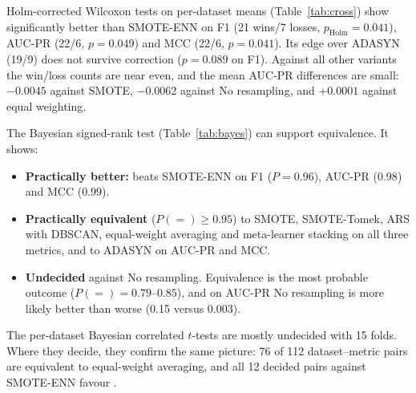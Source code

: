 Holm-corrected Wilcoxon tests on per-dataset means (Table~\ref{tab:cross}) show \ars{} significantly better than
SMOTE-ENN on F1 (21 wins/7 losses, $p_{\mathrm{Holm}}=0.041$), AUC-PR (22/6, $p=0.049$) and MCC (22/6, $p=0.041$). Its
edge over ADASYN (19/9) does not survive correction ($p=0.089$ on F1). Against all other variants the win/loss counts
are near even, and the mean AUC-PR differences are small: $-0.0045$ against SMOTE, $-0.0062$ against No resampling,
and $+0.0001$ against equal weighting.

\begin{widetable}
  \centering
  \caption{\ars{} against each variant over 28 datasets: wins/ties/losses of \ars{}, mean difference $\Delta$
  (\ars{} $-$ baseline) and Holm-corrected Wilcoxon $p$ (bold: $p<0.05$).}
  \label{tab:cross}
  \footnotesize
  \setlength{\tabcolsep}{3.5pt}
  
\end{widetable}

The Bayesian signed-rank test (Table~\ref{tab:bayes}) can support equivalence. It shows:
\begin{itemize}
  \item \textbf{Practically better:} \ars{} beats SMOTE-ENN on F1 ($P=0.96$), AUC-PR ($0.98$) and MCC ($0.99$).
  \item \textbf{Practically equivalent} ($P(=)\geq0.95$) to SMOTE, SMOTE-Tomek, ARS with DBSCAN, equal-weight
        averaging and meta-learner stacking on all three metrics, and to ADASYN on AUC-PR and MCC.
  \item \textbf{Undecided} against No resampling. Equivalence is the most probable outcome ($P(=)=0.79$--$0.85$), and on
        AUC-PR No resampling is more likely better than worse (0.15 versus 0.003).
\end{itemize}
The per-dataset Bayesian correlated $t$-tests are mostly undecided with 15 folds. Where they decide, they confirm the
same picture: 76 of 112 dataset--metric pairs are equivalent to equal-weight averaging, and all 12 decided pairs against
SMOTE-ENN favour \ars{}.

\begin{widetable}
  \centering
  \caption{Bayesian signed-rank test over 28 datasets (ROPE $\pm0.01$): posterior probability that the baseline is
  practically better / equivalent / worse than \ars{}; a verdict needs $P\geq0.95$.}
  \label{tab:bayes}
  \footnotesize
  \setlength{\tabcolsep}{2.5pt}
  
\end{widetable}

